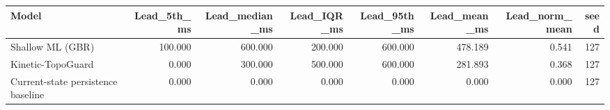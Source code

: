 \begin{tabular}{lrrrrrrr}
\toprule
Model & Lead\_5th\_ms & Lead\_median\_ms & Lead\_IQR\_ms & Lead\_95th\_ms & Lead\_mean\_ms & Lead\_norm\_mean & seed \\
\midrule
Shallow ML (GBR) & 100.000 & 600.000 & 200.000 & 600.000 & 478.189 & 0.541 & 127 \\
Kinetic-TopoGuard & 0.000 & 300.000 & 500.000 & 600.000 & 281.893 & 0.368 & 127 \\
Current-state persistence baseline & 0.000 & 0.000 & 0.000 & 0.000 & 0.000 & 0.000 & 127 \\
\bottomrule
\end{tabular}